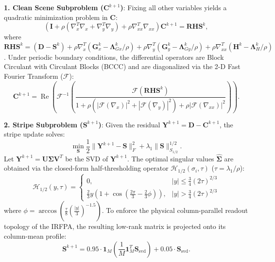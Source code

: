 \textbf{1. Clean Scene Subproblem ($\mathbf{C}^{k+1}$)}: Fixing all other variables yields a quadratic minimization problem in $\mathbf{C}$:
\begin{equation}
\label{eq:c_subproblem}
\left( \mathbf{I} + \rho (\nabla_x^T \nabla_x + \nabla_y^T \nabla_y) + \rho \nabla_{xx}^T \nabla_{xx} \right) \mathbf{C}^{k+1} = \mathbf{RHS}^k,
\end{equation}
where $\mathbf{RHS}^k = (\mathbf{D} - \mathbf{S}^k) + \rho \nabla_x^T (\mathbf{G}_x^k - \mathbf{\Lambda}_{Gx}^k/\rho) + \rho \nabla_y^T (\mathbf{G}_y^k - \mathbf{\Lambda}_{Gy}^k/\rho) + \rho \nabla_{xx}^T (\mathbf{H}^k - \mathbf{\Lambda}_H^k/\rho)$.
Under periodic boundary conditions, the differential operators are Block Circulant with Circulant Blocks (BCCC) and are diagonalized via the 2-D Fast Fourier Transform ($\mathcal{F}$):
\begin{equation}
\label{eq:c_fft_solution}
\mathbf{C}^{k+1} = \operatorname{Re}\left( \mathcal{F}^{-1} \left( \frac{\mathcal{F}(\mathbf{RHS}^k)}{1 + \rho (|\mathcal{F}(\nabla_x)|^2 + |\mathcal{F}(\nabla_y)|^2) + \rho |\mathcal{F}(\nabla_{xx})|^2} \right) \right).
\end{equation}

\textbf{2. Stripe Subproblem ($\mathbf{S}^{k+1}$)}: Given the residual $\mathbf{Y}^{k+1} = \mathbf{D} - \mathbf{C}^{k+1}$, the stripe update solves:
\begin{equation}
\label{eq:s_subproblem}
\min_{\mathbf{S}} \frac{1}{2} \|\mathbf{Y}^{k+1} - \mathbf{S}\|_F^2 + \lambda_1 \|\mathbf{S}\|_{S_{1/2}}^{1/2}.
\end{equation}
Let $\mathbf{Y}^{k+1} = \mathbf{U} \mathbf{\Sigma} \mathbf{V}^T$ be the SVD of $\mathbf{Y}^{k+1}$. The optimal singular values $\widehat{\mathbf{\Sigma}}$ are obtained via the closed-form half-thresholding operator $\mathcal{H}_{1/2}(\sigma_i, \tau)$ ($\tau = \lambda_1/\rho$):
\begin{equation}
\mathcal{H}_{1/2}(y, \tau) = \begin{cases}
0, & |y| \le \frac{3}{4} (2\tau)^{2/3} \\
\frac{2}{3} y \left(1 + \cos\left(\frac{2\pi}{3} - \frac{2}{3}\phi\right)\right), & |y| > \frac{3}{4} (2\tau)^{2/3}
\end{cases}
\end{equation}
where $\phi = \arccos\left(\frac{\tau}{8}\left(\frac{|y|}{3}\right)^{-1.5}\right)$. To enforce the physical column-parallel readout topology of the IRFPA, the resulting low-rank matrix is projected onto its column-mean profile:
\begin{equation}
\mathbf{S}^{k+1} = 0.95 \cdot \mathbf{1}_M \left(\frac{1}{M} \mathbf{1}_M^T \mathbf{S}_{\mathrm{svd}}\right) + 0.05 \cdot \mathbf{S}_{\mathrm{svd}}.
\end{equation}

